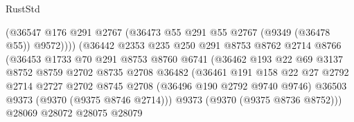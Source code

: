 \begin{lexlean}{RustStd}
\begin{coremodule}
                                        (@36547
                                          @176
                                          @291
                                          @2767
                                          (@36473 @55 @291 @55 @2767 (@9349 (@36478 @55)) @9572))))
                                    (@36442
                                      @2353
                                      @235
                                      @250
                                      @291
                                      @8753
                                      @8762
                                      @2714
                                      @8766
                                      (@36453
                                        @1733
                                        @70
                                        @291
                                        @8753
                                        @8760
                                        @6741
                                        (@36462
                                          @193
                                          @22
                                          @69
                                          @3137
                                          @8752
                                          @8759
                                          @2702
                                          @8735
                                          @2708
                                          @36482
                                          (@36461
                                            @191
                                            @158
                                            @22
                                            @27
                                            @2792
                                            @2714
                                            @2727
                                            @2702
                                            @8745
                                            @2708
                                            (@36496 @190 @2792 @9740 @9746)
                                            @36503
                                            @9373
                                            (@9370 (@9375 @8746 @2714)))
                                          @9373
                                          (@9370 (@9375 @8736 @8752)))
                                        @28069
                                        @28072
                                        @28075
                                        @28079

\end{coremodule}
\end{lexlean}
